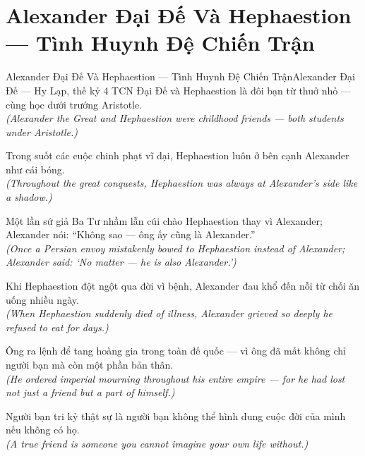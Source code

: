 \section{Alexander Đại Đế Và Hephaestion --- Tình Huynh Đệ Chiến Trận}
\begin{truyen}{Alexander Đại Đế Và Hephaestion --- Tình Huynh Đệ Chiến Trận}{Alexander Đại Đế --- Hy Lạp, thế kỷ 4 TCN}
 Đại Đế và Hephaestion là đôi bạn từ thuở nhỏ --- cùng học dưới trướng Aristotle.\\[4pt]
\textit{(Alexander the Great and Hephaestion were childhood friends --- both students under Aristotle.)}

Trong suốt các cuộc chinh phạt vĩ đại, Hephaestion luôn ở bên cạnh Alexander như cái bóng.\\[4pt]
\textit{(Throughout the great conquests, Hephaestion was always at Alexander's side like a shadow.)}

Một lần sứ giả Ba Tư nhầm lẫn cúi chào Hephaestion thay vì Alexander; Alexander nói: ``Không sao --- ông ấy cũng là Alexander.''\\[4pt]
\textit{(Once a Persian envoy mistakenly bowed to Hephaestion instead of Alexander; Alexander said: `No matter --- he is also Alexander.')}

Khi Hephaestion đột ngột qua đời vì bệnh, Alexander đau khổ đến nỗi từ chối ăn uống nhiều ngày.\\[4pt]
\textit{(When Hephaestion suddenly died of illness, Alexander grieved so deeply he refused to eat for days.)}

Ông ra lệnh để tang hoàng gia trong toàn đế quốc --- vì ông đã mất không chỉ người bạn mà còn một phần bản thân.\\[4pt]
\textit{(He ordered imperial mourning throughout his entire empire --- for he had lost not just a friend but a part of himself.)}

\end{truyen}
\begin{baihoc}
  Người bạn tri kỷ thật sự là người bạn không thể hình dung cuộc đời của mình nếu không có họ.\\[4pt]
  \textit{(A true friend is someone you cannot imagine your own life without.)}
\end{baihoc}

